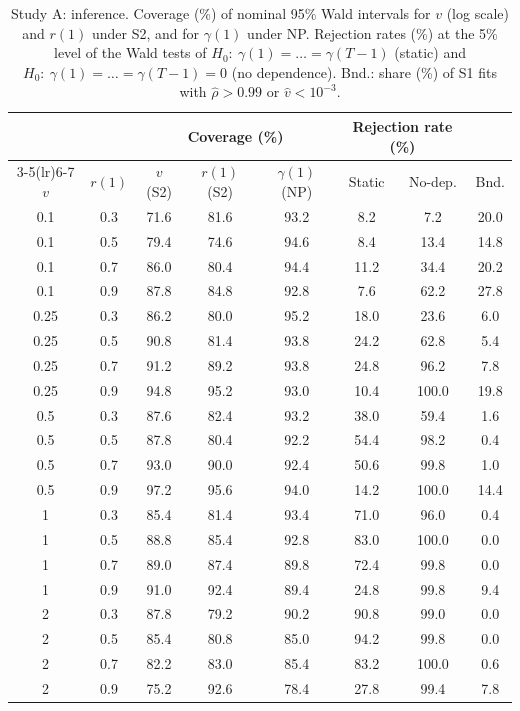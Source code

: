 \documentclass[mathematics,article,submit,moreauthors]{Definitions/mdpi}
\begin{document}
\begin{table}[H]
\caption{Study A: inference. Coverage (\%) of nominal 95\% Wald intervals for $v$ (log scale) and $r(1)$ under S2, and for $\gamma(1)$ under NP. Rejection rates (\%) at the 5\% level of the Wald tests of $H_0{:}\ \gamma(1)=\dots=\gamma(T-1)$ (static) and $H_0{:}\ \gamma(1)=\dots=\gamma(T-1)=0$ (no dependence). Bnd.: share (\%) of S1 fits with $\hat\rho>0.99$ or $\hat v<10^{-3}$.\label{tab:infA}}
\small
\begin{tabular*}{\textwidth}{@{\extracolsep{\fill}}cccccccc@{}}
\toprule
 & & \multicolumn{3}{c}{Coverage (\%)} & \multicolumn{2}{c}{Rejection rate (\%)} & \\
\cmidrule(lr){3-5}\cmidrule(lr){6-7}
$v$ & $r(1)$ & $v$ (S2) & $r(1)$ (S2) & $\gamma(1)$ (NP) & Static & No-dep. & Bnd. \\
\midrule
0.1 & 0.3 & 71.6 & 81.6 & 93.2 & 8.2 & 7.2 & 20.0 \\
0.1 & 0.5 & 79.4 & 74.6 & 94.6 & 8.4 & 13.4 & 14.8 \\
0.1 & 0.7 & 86.0 & 80.4 & 94.4 & 11.2 & 34.4 & 20.2 \\
0.1 & 0.9 & 87.8 & 84.8 & 92.8 & 7.6 & 62.2 & 27.8 \\
0.25 & 0.3 & 86.2 & 80.0 & 95.2 & 18.0 & 23.6 & 6.0 \\
0.25 & 0.5 & 90.8 & 81.4 & 93.8 & 24.2 & 62.8 & 5.4 \\
0.25 & 0.7 & 91.2 & 89.2 & 93.8 & 24.8 & 96.2 & 7.8 \\
0.25 & 0.9 & 94.8 & 95.2 & 93.0 & 10.4 & 100.0 & 19.8 \\
0.5 & 0.3 & 87.6 & 82.4 & 93.2 & 38.0 & 59.4 & 1.6 \\
0.5 & 0.5 & 87.8 & 80.4 & 92.2 & 54.4 & 98.2 & 0.4 \\
0.5 & 0.7 & 93.0 & 90.0 & 92.4 & 50.6 & 99.8 & 1.0 \\
0.5 & 0.9 & 97.2 & 95.6 & 94.0 & 14.2 & 100.0 & 14.4 \\
1 & 0.3 & 85.4 & 81.4 & 93.4 & 71.0 & 96.0 & 0.4 \\
1 & 0.5 & 88.8 & 85.4 & 92.8 & 83.0 & 100.0 & 0.0 \\
1 & 0.7 & 89.0 & 87.4 & 89.8 & 72.4 & 99.8 & 0.0 \\
1 & 0.9 & 91.0 & 92.4 & 89.4 & 24.8 & 99.8 & 9.4 \\
2 & 0.3 & 87.8 & 79.2 & 90.2 & 90.8 & 99.0 & 0.0 \\
2 & 0.5 & 85.4 & 80.8 & 85.0 & 94.2 & 99.8 & 0.0 \\
2 & 0.7 & 82.2 & 83.0 & 85.4 & 83.2 & 100.0 & 0.6 \\
2 & 0.9 & 75.2 & 92.6 & 78.4 & 27.8 & 99.4 & 7.8 \\
\bottomrule
\end{tabular*}
\end{table}
\end{document}
